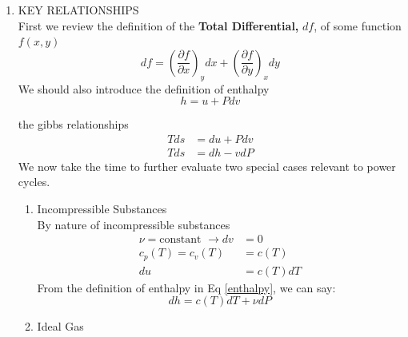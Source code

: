 \documentclass{article}
\begin{document}
\begin{enumerate}
\begin{enumerate}
        \item{KEY RELATIONSHIPS}\\
        First we review the definition of the {\bf Total Differential, }$df$, of some function $f(x,y)$\\
        \begin{equation}
            df = \left(\frac{\partial f}{\partial x}\right)_ydx + \left(\frac{\partial f}{\partial y}\right)_xdy
        \end{equation}
        We should also introduce the definition of enthalpy\\
        \begin{equation}\label{enthalpy}
            h = u + Pdv
        \end{equation}
        
        the gibbs relationships\\
        \begin{equation}\label{gibbs}
            \begin{aligned}
            Tds &= du + Pdv\\
            Tds &= dh - vdP
        \end{aligned}\end{equation}
        We now take the time to further evaluate two special cases relevant to power cycles.
        \begin{enumerate}
            \item{Incompressible Substances}\\
                By nature of incompressible substances\\
                \begin{equation*}
                    \begin{aligned}
                    \nu = \text{constant } \to dv &= 0\\
                    c_p(T) = c_v(T) &= c(T)\\
                    du &= c(T) dT
                    \end{aligned}
                \end{equation*}
                From the definition of enthalpy in Eq \ref{enthalpy}, we can say:
                \begin{equation}
                    dh = c(T)dT + \nu dP
                \end{equation}
            \item {Ideal Gas}\\

\end{enumerate}
\end{enumerate}
\end{enumerate}
\end{document}
